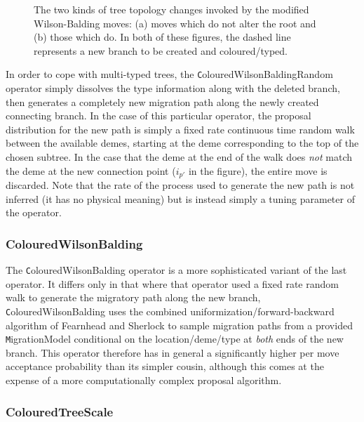 \documentclass[a4paper,11pt]{article}
\newcommand{\class}[1]{{\texttt #1}}
\begin{document}
\begin{figure}
\caption{The two kinds of tree topology changes invoked by the
  modified Wilson-Balding moves: (a) moves which do not alter the root
  and (b) those which do.  In both of these figures, the dashed line
  represents a new branch to be created and coloured/typed.}
\label{fig:WBmove}
\end{figure}

 In order to cope with multi-typed trees, the
\class{ColouredWilsonBaldingRandom} operator simply dissolves the type
information along with the deleted branch, then generates a completely
new migration path along the newly created connecting branch.  In the
case of this particular operator, the proposal distribution for the
new path is simply a fixed rate continuous time random walk between
the available demes, starting at the deme corresponding to the top of
the chosen subtree.  In the case that the deme at the end of the walk
does \emph{not} match the deme at the new connection point ($i_{p'}$
in the figure), the entire move is discarded.  Note that the rate of
the process used to generate the new path is not inferred (it has no
physical meaning) but is instead simply a tuning parameter of the operator.

\subsubsection{ColouredWilsonBalding}

The \class{ColouredWilsonBalding} operator is a more sophisticated
variant of the last operator.  It differs only in that where that
operator used a fixed rate random walk to generate the migratory path
along the new branch, \class{ColouredWilsonBalding} uses the combined
uniformization/forward-backward algorithm of Fearnhead and Sherlock
\cite{Fearnhead2006} to sample migration paths from a provided
\class{MigrationModel} conditional on the location/deme/type at
\emph{both} ends of the new branch.  This operator therefore has in
general a significantly higher per move acceptance probability than
its simpler cousin, although this comes at the expense of a more
computationally complex proposal algorithm.

\subsubsection{ColouredTreeScale}
\end{document}
